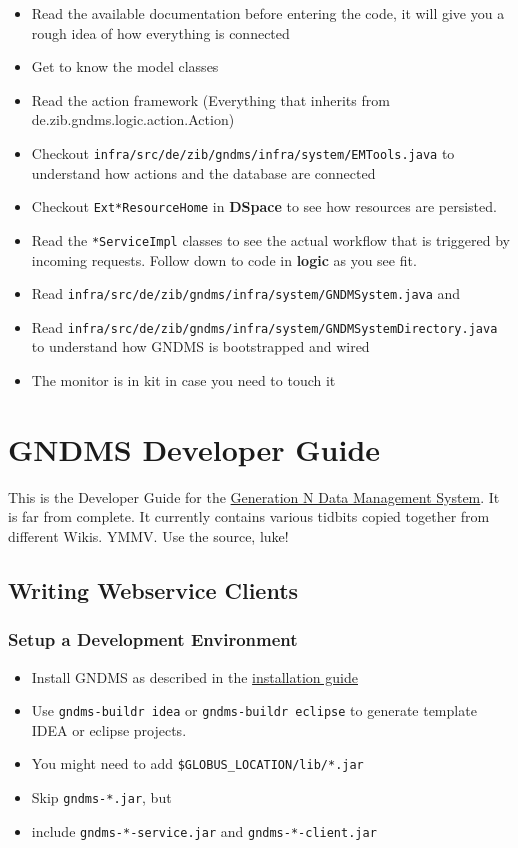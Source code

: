 \documentclass{article}
\begin{document}
\begin{itemize}
\item
  Read the available documentation before entering the code, it will
  give you a rough idea of how everything is connected
\item
  Get to know the model classes
\item
  Read the action framework (Everything that inherits from
  de.zib.gndms.logic.action.Action)
\item
  Checkout \verb!infra/src/de/zib/gndms/infra/system/EMTools.java! to
  understand how actions and the database are connected
\item
  Checkout \verb!Ext*ResourceHome! in \textbf{DSpace} to see how
  resources are persisted.
\item
  Read the \verb!*ServiceImpl! classes to see the actual workflow
  that is triggered by incoming requests. Follow down to code in
  \textbf{logic} as you see fit.
\item
  Read \verb!infra/src/de/zib/gndms/infra/system/GNDMSystem.java! and
\item
  Read \verb!infra/src/de/zib/gndms/infra/system/GNDMSystemDirectory.java!
  to understand how GNDMS is bootstrapped and wired
\item
  The monitor is in kit in case you need to touch it
\end{itemize}

\section{GNDMS Developer Guide}

This is the Developer Guide for the
\href{../index.html}{Generation N Data Management System}. It is
far from complete. It currently contains various tidbits copied
together from different Wikis. YMMV. Use the source, luke!

\subsection{Writing Webservice Clients}

\subsubsection{Setup a Development Environment}

\begin{itemize}
\item
  Install GNDMS as described in the
  \href{../installation-guide}{installation guide}
\item
  Use \verb!gndms-buildr idea! or \verb!gndms-buildr eclipse! to
  generate template IDEA or eclipse projects.
\item
  You might need to add \verb!$GLOBUS_LOCATION/lib/*.jar!
\item
  Skip \verb!gndms-*.jar!, but
\item
  include \verb!gndms-*-service.jar! and \verb!gndms-*-client.jar!
\end{itemize}
\end{document}
